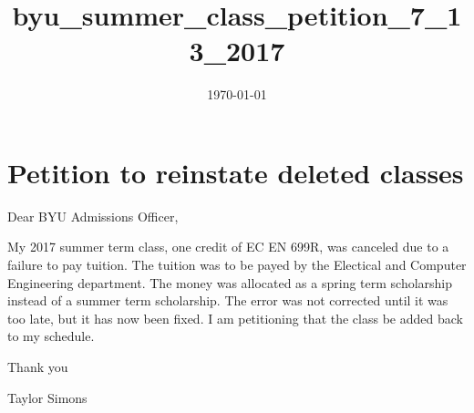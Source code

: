 \documentclass[11pt]{article}
\date{\today}
\title{byu\_summer\_class\_petition\_7\_13\_2017}
\begin{document}
\maketitle
\tableofcontents

\section{Petition to reinstate deleted classes}
\label{sec-1}
Dear BYU Admissions Officer,

My 2017 summer term class, one credit of EC EN 699R, was canceled due to a failure to pay tuition.
The tuition was to be payed by the Electical and Computer Engineering department.
The money was allocated as a spring term scholarship instead of a summer term scholarship.
The error was not corrected until it was too late, but it has now been fixed. 
I am petitioning that the class be added back to my schedule.

Thank you




Taylor Simons
\end{document}
